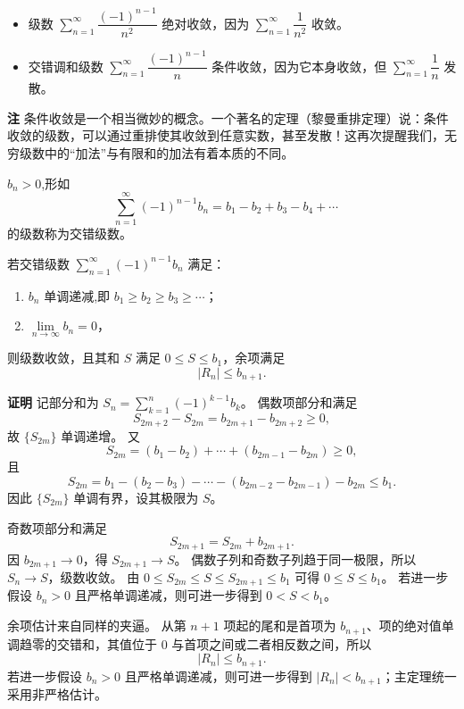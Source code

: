 \documentclass[fontset=fandol]{ctexart}
\newenvironment{custom}[1]{\par\noindent\textbf{#1}\quad}{\par\vspace{0.8em}}
\newenvironment{remark}{\par\noindent\textbf{注}\quad}{\par\vspace{0.8em}}
\begin{document}
\begin{example}
	\begin{itemize}
		\item 级数 \(\sum\limits_{n = 1}^{  \infty } \dfrac{(-1)^{n-1}}{n^2}\) 绝对收敛，因为 \(\sum\limits_{n = 1}^{  \infty } \dfrac{1}{n^2}\) 收敛。
		\item 交错调和级数 \(\sum\limits_{n = 1}^{  \infty } \dfrac{(-1)^{n-1}}{n}\) 条件收敛，因为它本身收敛，但 \(\sum\limits_{n = 1}^{  \infty } \dfrac{1}{n}\) 发散。
	\end{itemize}
\end{example}

\begin{remark}
	条件收敛是一个相当微妙的概念。一个著名的定理（黎曼重排定理）说：条件收敛的级数，可以通过重排使其收敛到任意实数，甚至发散！这再次提醒我们，无穷级数中的“加法”与有限和的加法有着本质的不同。
\end{remark}



\begin{definition}[交错级数]
$b_n > 0$,形如
\[
\sum_{n=1}^{\infty} (-1)^{n-1} b_n = b_1 - b_2 + b_3 - b_4 + \cdots \quad 
\]
的级数称为交错级数。
\end{definition}

\begin{theorem}[莱布尼茨判别法]
若交错级数 \(\sum_{n=1}^{\infty} (-1)^{n-1} b_n\) 满足：
\begin{enumerate}
\item \(b_n\) 单调递减,即 \(b_1 \geq b_2 \geq b_3 \geq \cdots\)；
\item \(\lim\limits_{n\to\infty} b_n = 0\)，
\end{enumerate}
则级数收敛，且其和 \(S\) 满足 \(\boxed{0\leq S\leq b_1}\)，余项满足
\[
\boxed{|R_n|\le b_{n+1}}.
\]
\end{theorem}

\begin{custom}{证明}
记部分和为 $S_n=\sum\limits_{k=1}^{n}(-1)^{k-1}b_k$。 偶数项部分和满足
\[
S_{2m+2}-S_{2m}=b_{2m+1}-b_{2m+2}\ge0,
\]
故 $\{S_{2m}\}$ 单调递增。 又
\[
S_{2m}=(b_1-b_2)+\cdots+(b_{2m-1}-b_{2m})\ge0,
\]
且
\[
S_{2m}=b_1-(b_2-b_3)-\cdots-(b_{2m-2}-b_{2m-1})-b_{2m}\le b_1.
\]
因此 $\{S_{2m}\}$ 单调有界，设其极限为 $S$。

奇数项部分和满足
\[
S_{2m+1}=S_{2m}+b_{2m+1}.
\]
因 $b_{2m+1}\to0$，得 $S_{2m+1}\to S$。 偶数子列和奇数子列趋于同一极限，所以 $S_n\to S$，级数收敛。 由 $0\le S_{2m}\le S\le S_{2m+1}\le b_1$ 可得 $0\le S\le b_1$。 若进一步假设 $b_n>0$ 且严格单调递减，则可进一步得到 $0<S<b_1$。

余项估计来自同样的夹逼。 从第 $n+1$ 项起的尾和是首项为 $b_{n+1}$、项的绝对值单调趋零的交错和，其值位于 $0$ 与首项之间或二者相反数之间，所以
\[
|R_n|\le b_{n+1}.
\]
若进一步假设 $b_n>0$ 且严格单调递减，则可进一步得到 $|R_n|<b_{n+1}$；主定理统一采用非严格估计。
\end{custom}
\end{document}
